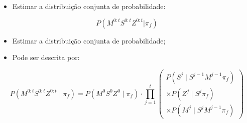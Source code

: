 \documentclass{beamer}
\begin{document}
\begin{frame}
\begin{overprint}
\begin{itemize}
	\item Estimar a distribuição conjunta de probabilidade:
\end{itemize}

$$ P \left( M^{0:t} S^{0:t} Z^{0:t} | \pi_f \right) $$
\begin{itemize}
	\item Estimar a distribuição conjunta de probabilidade;
	\item Pode ser descrita por:
\end{itemize}

$$
	P ( M^{0: t} S^{0: t} Z^{0: t} \mid \pi_f ) = P ( M^0 S^0 Z^0 \mid \pi_f ) \cdot \prod\limits_{j =1}^{t} 
        \left(
            \begin{array}{l}
                P( S^j \mid S^{j -1} M^{j -1} \pi_f ) \\
                \times P( Z^j \mid S^j \pi_f ) \\
                \times P( M^j \mid S^j M^{j -1} \pi_f )
            \end{array}
        \right)
$$
\end{overprint}

\end{frame}

\end{document}
